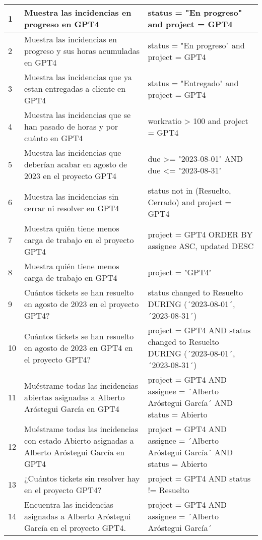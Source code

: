 \begin{center}
\begin{longtable}{ | p{1cm} | p{8cm} | p{6cm} | }
        1 & Muestra las incidencias en progreso en GPT4 & status = "En progreso" and project = GPT4 \\
        \hline
        2 & Muestra las incidencias en progreso y sus horas acumuladas en GPT4 & status = "En progreso" and project = GPT4 \\
        \hline
        3 & Muestra las incidencias que ya estan entregadas a cliente en GPT4 & status = "Entregado" and project = GPT4 \\
        \hline
        4 & Muestra las incidencias que se han pasado de horas y por cuánto en GPT4 & workratio > 100 and project = GPT4 \\
        \hline
        5 & Muestra las incidencias que deberían acabar en agosto de 2023 en el proyecto GPT4 & due >= "2023-08-01" AND due <= "2023-08-31" \\
        \hline
        6 & Muestra las incidencias sin cerrar ni resolver en GPT4 & status not in (Resuelto, Cerrado) and project = GPT4 \\
        \hline
        7 & Muestra quién tiene menos carga de trabajo en el proyecto GPT4 & project = GPT4 ORDER BY assignee ASC, updated DESC \\
        \hline
        8 & Muestra quién tiene menos carga de trabajo en GPT4 & project = "GPT4" \\
        \hline
        9 & Cuántos tickets se han resuelto en agosto de 2023 en el proyecto GPT4? & status changed to Resuelto DURING (´2023-08-01´, ´2023-08-31´) \\
        \hline
        10 & Cuántos tickets se han resuelto en agosto de 2023 en GPT4 en el proyecto GPT4? & project = GPT4 AND status changed to Resuelto DURING (´2023-08-01´, ´2023-08-31´) \\
        \hline
        11 & Muéstrame todas las incidencias abiertas asignadas a Alberto Aróstegui García en GPT4 & project = GPT4 AND assignee = ´Alberto Aróstegui García´ AND status = Abierto \\
        \hline
        12 & Muéstrame todas las incidencias con estado Abierto asignadas a Alberto Aróstegui García en GPT4 & project = GPT4 AND assignee = ´Alberto Aróstegui García´ AND status = Abierto \\
        \hline
        13 & ¿Cuántos tickets sin resolver hay en el proyecto GPT4? & project = GPT4 AND status != Resuelto \\
        \hline
        14 & Encuentra las incidencias asignadas a Alberto Aróstegui García en el proyecto GPT4. & project = GPT4 AND assignee = ´Alberto Aróstegui García´ \\

\end{longtable}
\end{center}
